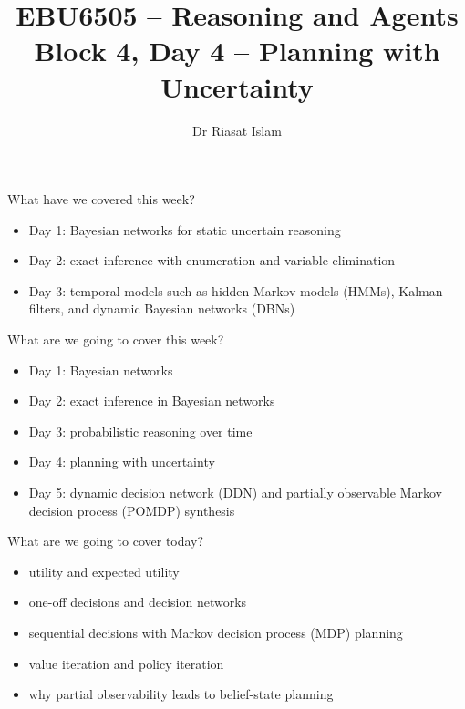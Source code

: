 \documentclass[aspectratio=169]{beamer}
\title[EBU6505 B4 D4]{EBU6505 -- Reasoning and Agents\\Block 4, Day 4 -- Planning with Uncertainty}
\author{Dr Riasat Islam}
\institute{Queen Mary University of London}
\date{}
\newcommand{\defaultdeckrefs}{AIMA4e Ch.16--17; Poole3e Ch.12}
\newcommand{\currentsliderefs}{\defaultdeckrefs}
\newcommand{\setslideref}[1]{\gdef\currentsliderefs{#1}}
\begin{document}
\setslideref{AIMA4e Ch.16--17; Poole3e Ch.12}
\begin{frame}
  \titlepage
\end{frame}

\begin{frame}{What have we covered this week?}
\begin{itemize}
  \item Day 1: Bayesian networks for static uncertain reasoning
  \item Day 2: exact inference with enumeration and variable elimination
  \item Day 3: temporal models such as hidden Markov models (HMMs), Kalman filters, and dynamic Bayesian networks (DBNs)
\end{itemize}
\end{frame}

\begin{frame}{What are we going to cover this week?}
\begin{itemize}
  \item Day 1: Bayesian networks
  \item Day 2: exact inference in Bayesian networks
  \item Day 3: probabilistic reasoning over time
  \item Day 4: planning with uncertainty
  \item Day 5: dynamic decision network (DDN) and partially observable Markov decision process (POMDP) synthesis
\end{itemize}
\end{frame}

\begin{frame}{What are we going to cover today?}
\begin{itemize}
  \item utility and expected utility
  \item one-off decisions and decision networks
  \item sequential decisions with Markov decision process (MDP) planning
  \item value iteration and policy iteration
  \item why partial observability leads to belief-state planning
\end{itemize}
\end{frame}
\end{document}
